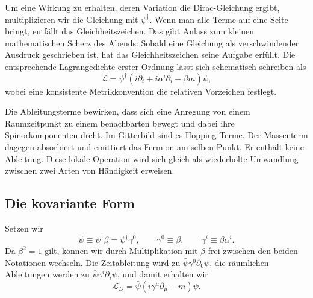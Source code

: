 Um eine Wirkung zu erhalten, deren Variation die Dirac-Gleichung ergibt, multiplizieren wir die Gleichung mit \(\psi^\dagger\). Wenn man alle Terme auf eine Seite bringt, entfällt das Gleichheitszeichen. Das gibt Anlass zum kleinen mathematischen Scherz des Abends: Sobald eine Gleichung als verschwindender Ausdruck geschrieben ist, hat das Gleichheitszeichen seine Aufgabe erfüllt. Die entsprechende Lagrangedichte erster Ordnung lässt sich schematisch schreiben als
\begin{equation}
  \mathcal L
  =
  \psi^\dagger
  \left(i\partial_t+i\alpha^i\partial_i-\beta m\right)\psi ,
  \label{eq:l10-dirac-old-lagrangian}
\end{equation}
wobei eine konsistente Metrikkonvention die relativen Vorzeichen festlegt.

Die Ableitungsterme bewirken, dass sich eine Anregung von einem Raumzeitpunkt zu einem benachbarten bewegt und dabei ihre Spinorkomponenten dreht. Im Gitterbild sind es Hopping-Terme. Der Massenterm dagegen absorbiert und emittiert das Fermion am selben Punkt. Er enthält keine Ableitung. Diese lokale Operation wird sich gleich als wiederholte Umwandlung zwischen zwei Arten von Händigkeit erweisen.

\begin{classroomqa}
\end{classroomqa}

\subsection{Die kovariante Form}

Setzen wir
\begin{equation}
  \bar\psi\equiv\psi^\dagger\beta
  =\psi^\dagger\gamma^0,
  \qquad
  \gamma^0\equiv\beta,
  \qquad
  \gamma^i\equiv\beta\alpha^i .
  \label{eq:l10-dirac-adjoint}
\end{equation}
Da \(\beta^2=1\) gilt, können wir durch Multiplikation mit \(\beta\) frei zwischen den beiden Notationen wechseln. Die Zeitableitung wird zu
\(\bar\psi\gamma^0\partial_0\psi\), die räumlichen Ableitungen werden zu
\(\bar\psi\gamma^i\partial_i\psi\), und damit erhalten wir
\begin{equation}
  \boxed{\mathcal L_D
  =\bar\psi\left(i\gamma^\mu\partial_\mu-m\right)\psi .}
  \label{eq:l10-covariant-dirac}
\end{equation}

